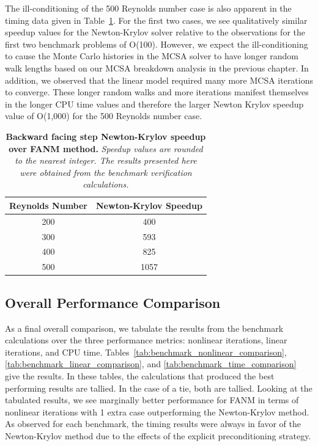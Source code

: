 The ill-conditioning of the 500 Reynolds number case is also apparent
in the timing data given in
Table~\ref{tab:step_speedup_comparison}. For the first two cases, we
see qualitatively similar speedup values for the Newton-Krylov solver
relative to the observations for the first two benchmark problems of
O(100). However, we expect the ill-conditioning to cause the Monte
Carlo histories in the MCSA solver to have longer random walk lengths
based on our MCSA breakdown analysis in the previous chapter. In
addition, we observed that the linear model required many more MCSA
iterations to converge. These longer random walks and more iterations
manifest themselves in the longer CPU time values and therefore the
larger Newton Krylov speedup value of O(1,000) for the 500 Reynolds
number case.

\begin{table}[h!]
  \begin{center}
    \begin{tabular}{cc}\hline\hline
      \multicolumn{1}{c}{Reynolds Number}& 
      \multicolumn{1}{c}{Newton-Krylov Speedup}\\
      \hline
      200 & 400 \\
      300 & 593 \\
      400 & 825 \\
      500 & 1057 \\
      \hline\hline
    \end{tabular}
  \end{center}
  \caption{\textbf{Backward facing step Newton-Krylov speedup
      over FANM method.} \textit{Speedup values are rounded to the
      nearest integer. The results presented here were obtained from
      the benchmark verification calculations.}}
  \label{tab:step_speedup_comparison}
\end{table}


\subsection{Overall Performance Comparison}
\label{subsec:nonlinear_overall_comparison}

As a final overall comparison, we tabulate the results from the
benchmark calculations over the three performance metrics: nonlinear
iterations, linear iterations, and CPU
time. Tables~\ref{tab:benchmark_nonlinear_comparison},
\ref{tab:benchmark_linear_comparison}, and
\ref{tab:benchmark_time_comparison} give the results. In these tables,
the calculations that produced the best performing results are
tallied. In the case of a tie, both are tallied. Looking at the
tabulated results, we see marginally better performance for FANM in
terms of nonlinear iterations with 1 extra case outperforming the
Newton-Krylov method. As observed for each benchmark, the timing
results were always in favor of the Newton-Krylov method due to the
effects of the explicit preconditioning strategy.

